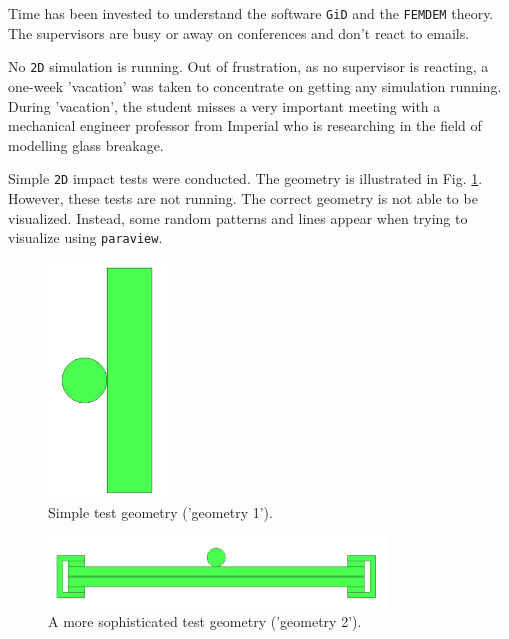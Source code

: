 Time has been invested to understand the software \texttt{GiD} and the \texttt{FEMDEM} theory. The supervisors are busy or away on conferences and don't react to emails.

\bigbreak
{}
No \texttt{2D} simulation is running. Out of frustration, as no supervisor is reacting, a one-week 'vacation' was taken to concentrate on getting any simulation running. During 'vacation', the student misses a very important meeting with a mechanical engineer professor from Imperial who is researching in the field of modelling glass breakage.

\bigbreak
{}
Simple \texttt{2D} impact tests were conducted. The geometry is illustrated in Fig. \ref{fig:initgeom}. However, these tests are not running. The correct geometry is not able to be visualized. Instead, some random patterns and lines appear when trying to visualize using \texttt{paraview}.

\begin{figure}
	\centering
	\includegraphics[width=0.3\textwidth]{initial_geometry.PNG}
	\caption{Simple test geometry ('geometry 1').}
	\label{fig:initgeom}
\end{figure}

\begin{figure}[!h]
	\centering
	\includegraphics[width=0.8\textwidth]{geometry2.PNG}
	\caption{A more sophisticated test geometry ('geometry 2').}
	\label{fig:geometry2}
\end{figure}

